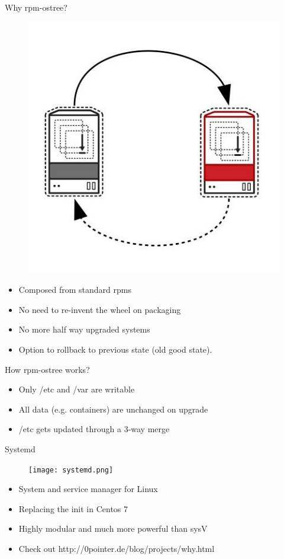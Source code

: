 \documentclass{beamer}
\begin{document}
\begin{frame}{Why rpm-ostree?}
\begin{figure}[htp]
\centering
\includegraphics[scale=0.25]{ostree.jpg}
\label{}
\end{figure}
\begin{itemize}
  \item Composed from standard rpms
  \item No need to re-invent the wheel on packaging
  \item No more half way upgraded systems
  \item Option to rollback to previous state (old good state).
\end{itemize}
\end{frame}

\begin{frame}{How rpm-ostree works?}
\begin{itemize}
  \item Only /etc and /var are writable
  \item All data (e.g. containers) are unchanged on upgrade
  \item /etc gets updated through a 3-way merge
\end{itemize}
\end{frame}

\begin{frame}{Systemd}
\begin{figure}[htp]
\centering
\texttt{[image: systemd.png]}
\label{}
\end{figure}
\begin{itemize}
  \item System and service manager for Linux 
  \item Replacing the init in Centos 7
  \item Highly modular and much more powerful than sysV
  \item Check out http://0pointer.de/blog/projects/why.html
\end{itemize}
\end{frame}
\end{document}

